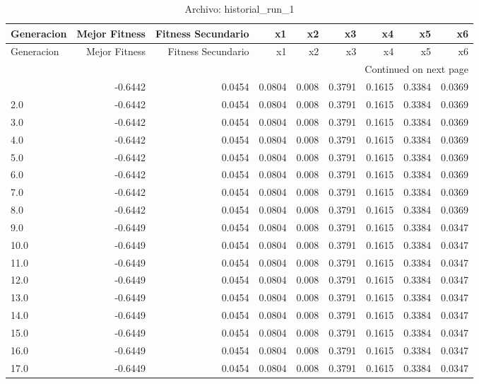 \begin{longtable}{lrrrrrrrr}
\caption{Archivo: historial\_run\_1}\label{tab:historial_run_1} \\
\toprule
Generacion & Mejor Fitness & Fitness Secundario & x1 & x2 & x3 & x4 & x5 & x6 \\
\midrule
\endfirsthead
\toprule
Generacion & Mejor Fitness & Fitness Secundario & x1 & x2 & x3 & x4 & x5 & x6 \\
\midrule
\endhead
\midrule
\multicolumn{9}{r}{Continued on next page} \\
\midrule
\endfoot
\bottomrule
\endlastfoot
1.0 & -0.6442 & 0.0454 & 0.0804 & 0.008 & 0.3791 & 0.1615 & 0.3384 & 0.0369 \\
2.0 & -0.6442 & 0.0454 & 0.0804 & 0.008 & 0.3791 & 0.1615 & 0.3384 & 0.0369 \\
3.0 & -0.6442 & 0.0454 & 0.0804 & 0.008 & 0.3791 & 0.1615 & 0.3384 & 0.0369 \\
4.0 & -0.6442 & 0.0454 & 0.0804 & 0.008 & 0.3791 & 0.1615 & 0.3384 & 0.0369 \\
5.0 & -0.6442 & 0.0454 & 0.0804 & 0.008 & 0.3791 & 0.1615 & 0.3384 & 0.0369 \\
6.0 & -0.6442 & 0.0454 & 0.0804 & 0.008 & 0.3791 & 0.1615 & 0.3384 & 0.0369 \\
7.0 & -0.6442 & 0.0454 & 0.0804 & 0.008 & 0.3791 & 0.1615 & 0.3384 & 0.0369 \\
8.0 & -0.6442 & 0.0454 & 0.0804 & 0.008 & 0.3791 & 0.1615 & 0.3384 & 0.0369 \\
9.0 & -0.6449 & 0.0454 & 0.0804 & 0.008 & 0.3791 & 0.1615 & 0.3384 & 0.0347 \\
10.0 & -0.6449 & 0.0454 & 0.0804 & 0.008 & 0.3791 & 0.1615 & 0.3384 & 0.0347 \\
11.0 & -0.6449 & 0.0454 & 0.0804 & 0.008 & 0.3791 & 0.1615 & 0.3384 & 0.0347 \\
12.0 & -0.6449 & 0.0454 & 0.0804 & 0.008 & 0.3791 & 0.1615 & 0.3384 & 0.0347 \\
13.0 & -0.6449 & 0.0454 & 0.0804 & 0.008 & 0.3791 & 0.1615 & 0.3384 & 0.0347 \\
14.0 & -0.6449 & 0.0454 & 0.0804 & 0.008 & 0.3791 & 0.1615 & 0.3384 & 0.0347 \\
15.0 & -0.6449 & 0.0454 & 0.0804 & 0.008 & 0.3791 & 0.1615 & 0.3384 & 0.0347 \\
16.0 & -0.6449 & 0.0454 & 0.0804 & 0.008 & 0.3791 & 0.1615 & 0.3384 & 0.0347 \\
17.0 & -0.6449 & 0.0454 & 0.0804 & 0.008 & 0.3791 & 0.1615 & 0.3384 & 0.0347 \\

\end{longtable}
